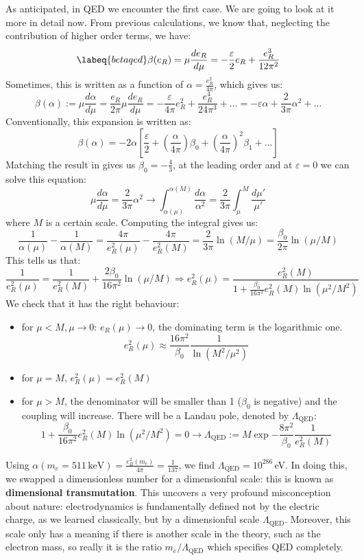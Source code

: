 \documentclass[../main.tex]{subfiles}
\begin{document}
As anticipated, in QED we encounter the first case. We are going to look at it more in detail now. From previous calculations, we know that, neglecting the contribution of higher order terms, we have:
\begin{equation}
\labeq{betaqed}
\beta(e_R)=\mu\frac{de_R}{d\mu}=-\frac{\varepsilon}{2}e_R+\frac{e_R^3}{12\pi^2}
\end{equation}
Sometimes, this is written as a function of $\alpha=\frac{e_R^2}{4\pi}$, which gives us:
\[
\beta(\alpha):=\mu\frac{d\alpha}{d\mu}=\frac{e_R}{2\pi}\mu\frac{de_R}{d\mu}=-\frac{\varepsilon}{4\pi}e_R^2+\frac{e_R^4}{24\pi^3}+\dots=-\varepsilon\alpha+\frac{2}{3\pi}\alpha^2+\dots
\]
Conventionally, this expansion is written as:
\[
\beta(\alpha)=-2\alpha\left[\frac{\varepsilon}{2}+\left(\frac{\alpha}{4\pi}\right)\beta_0+\left(\frac{\alpha}{4\pi}\right)^2\beta_1+\dots\right]
\]
Matching the result in  gives us $\beta_0=-\frac{4}{3}$, at the leading order and at $\varepsilon=0$ we can solve this equation:
\[
\mu\frac{d\alpha}{d\mu}=\frac{2}{3\pi}\alpha^2\to\int_{\alpha(\mu)}^{\alpha(M)}\frac{d\alpha}{\alpha^2}=\frac{2}{3\pi}\int_\mu^M\frac{d\mu'}{\mu'}
\]
where $M$ is a certain scale. Computing the integral gives us:
\[
\frac{1}{\alpha(\mu)}-\frac{1}{\alpha(M)}=\frac{4\pi}{e_R^2(\mu)}-\frac{4\pi}{e_R^2(M)}=\frac{2}{3\pi}\ln{(M/\mu)}=\frac{\beta_0}{2\pi}\ln{(\mu/M)}
\]
This tells us that:
\[
\frac{1}{e_R^2(\mu)}=\frac{1}{e_R^2(M)}+\frac{2\beta_0}{16\pi^2}\ln(\mu/M)\Rightarrow e_R^2(\mu)=\frac{e_R^2(M)}{1+\frac{\beta_0}{16\pi^2}e_R^2(M)\ln(\mu^2/M^2)}
\]
We check that it has the right behaviour:
\begin{itemize}
    \item for $\mu<M, \mu\to0$: $e_R(\mu)\to0$, the dominating term is the logarithmic one.
    \[
    e_R^2(\mu)\approx\frac{16\pi^2}{\beta_0}\frac{1}{\ln(M^2/\mu^2)}
    \]
    \item for $\mu=M$, $e_R^2(\mu)=e_R^2(M)$
    \item for $\mu>M$, the denominator will be smaller than 1 ($\beta_0$ is negative) and the coupling will increase. There will be a Landau pole, denoted by $\Lambda_{\text{QED}}$:
    \[
    1+\frac{\beta_0}{16\pi^2}e_R^2(M)\ln(\mu^2/M^2)=0\to\Lambda_{\text{QED}}:=M\exp{-\frac{8\pi^2}{\beta_0}\frac{1}{e_R^2(M)}}
    \]
\end{itemize}
Using $\alpha(m_e=511\,\text{keV})=\frac{e_R^2(m_e)}{4\pi}=\frac{1}{137}$, we find $\Lambda_{\text{QED}}=10^{286}$\,eV. In doing this, we swapped a dimensionless number for a dimensionful scale: this is known as \textbf{dimensional transmutation}. This uncovers a very profound misconception about nature: electrodynamics is fundamentally defined not by the electric charge, as we learned classically, but by a dimensionful scale $\Lambda_{\text{QED}}$. Moreover, this scale only has a meaning if there is another scale in the theory, such as the electron mass, so really it is the ratio $m_e/\Lambda_{\text{QED}}$ which specifies QED completely.\\
\end{document}
